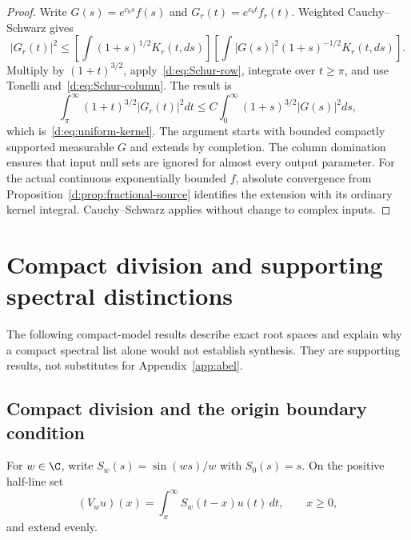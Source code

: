 \documentclass[11pt,a4paper]{article}
\numberwithin{equation}{section}
\theoremstyle{definition}\newtheorem{definition}[theorem]{Definition}
\theoremstyle{remark}\newtheorem{remark}[theorem]{Remark}
\begin{document}
\begin{proof}
Write $G(s)=e^{c_0s}f(s)$ and $G_r(t)=e^{c_0t}f_r(t)$. Weighted Cauchy--Schwarz gives
\[
 |G_r(t)|^2
 \le\left[\int(1+s)^{1/2}K_r(t,ds)\right]
       \left[\int |G(s)|^2(1+s)^{-1/2}K_r(t,ds)\right].
\]
Multiply by $(1+t)^{3/2}$, apply~\eqref{d:eq:Schur-row}, integrate over $t\ge\pi$, and use Tonelli and~\eqref{d:eq:Schur-column}. The result is
\[
 \int_\pi^\infty(1+t)^{3/2}|G_r(t)|^2dt
 \le C\int_0^\infty(1+s)^{3/2}|G(s)|^2ds,
\]
which is~\eqref{d:eq:uniform-kernel}. The argument starts with bounded compactly supported measurable $G$ and extends by completion. The column domination ensures that input null sets are ignored for almost every output parameter. For the actual continuous exponentially bounded $f$, absolute convergence from Proposition~\ref{d:prop:fractional-source} identifies the extension with its ordinary kernel integral. Cauchy--Schwarz applies without change to complex inputs.
\end{proof}


\section{Compact division and supporting spectral distinctions}\label{app:compactmodel}
The following compact-model results describe exact root spaces and explain why a compact spectral list alone would not establish synthesis. They are supporting results, not substitutes for Appendix~\ref{app:abel}.


\subsection{Compact division and the origin boundary condition}\label{d:sec:division}

For $w\in\C$, write $S_w(s)=\sin(ws)/w$ with $S_0(s)=s$. On the positive half-line set
\begin{equation}\label{d:eq:V-definition}
 (V_wu)(x)=\int_x^\infty S_w(t-x)u(t)\,dt,\qquad x\ge0,
\end{equation}
and extend evenly.
\end{document}
